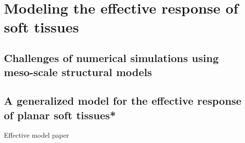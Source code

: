 \chapter{Modeling the effective response of soft tissues}

\section{Challenges of numerical simulations using meso-scale structural models}
\section{A generalized model for the effective response of planar soft tissues*}

Effective model paper